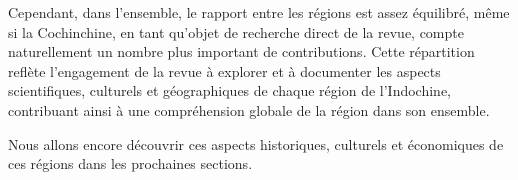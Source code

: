 Cependant, dans l'ensemble, le rapport entre les régions est assez équilibré, même si la Cochinchine, en tant qu'objet de recherche direct de la revue, compte naturellement un nombre plus important de contributions. Cette répartition reflète l'engagement de la revue à explorer et à documenter les aspects scientifiques, culturels et géographiques de chaque région de l'Indochine, contribuant ainsi à une compréhension globale de la région dans son ensemble.

Nous allons encore découvrir ces aspects historiques, culturels et économiques de ces régions dans les prochaines sections.
